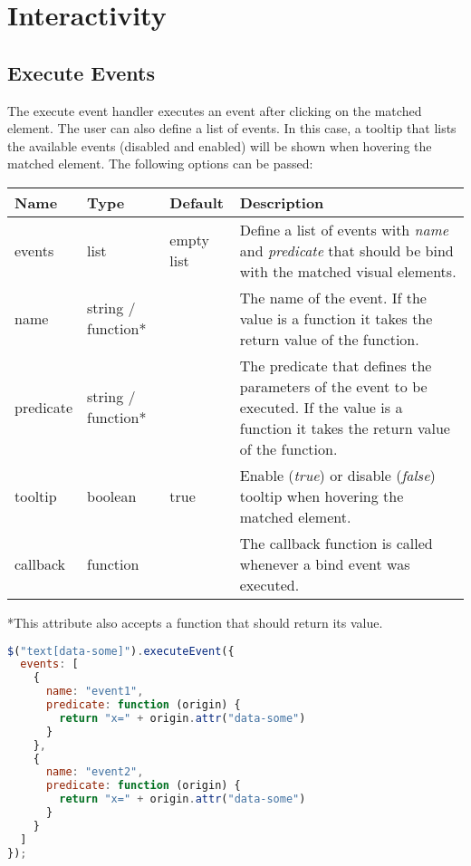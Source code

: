 \pagebreak

\section{Interactivity}
\label{sec:interactivity}

\subsection{Execute Events}
\label{sec:execute_events}

The execute event handler executes an event after clicking on the matched element.
The user can also define a list of events.
In this case, a tooltip that lists the available events (disabled and enabled) will be shown when hovering the matched element.
The following options can be passed:

\vspace{0.5cm}
\begin{tabular}{ l l l p{7cm} }
  \textbf{Name} & \textbf{Type} & \textbf{Default} & \textbf{Description} \\
  \hline\noalign{\medskip}
  events & list & empty list & Define a list of events with \textit{name} and \textit{predicate} that should be bind with the matched visual elements. \\
  \hline\noalign{\medskip}
  \hspace{0.5cm} name & string / function* & & The name of the event. If the value is a function it takes the return value of the function.\\
  \hline\noalign{\medskip}
  \hspace{0.5cm}  predicate & string / function* & & The predicate that defines the parameters of the event to be executed. If the value is a function it takes the return value of the function.\\
  \hline\noalign{\medskip}
  tooltip & boolean & true & Enable (\textit{true}) or disable (\textit{false}) tooltip when hovering the matched element.\\
  \hline\noalign{\medskip}
  callback & function &  & The callback function is called whenever a bind event was executed.
\end{tabular}

*This attribute also accepts a function that should return its value.

\begin{lstlisting}[float=ht!,language=JavaScript]
$("text[data-some]").executeEvent({
  events: [
    { 
      name: "event1", 
      predicate: function (origin) {
        return "x=" + origin.attr("data-some") 
      }
    },
    {
      name: "event2", 
      predicate: function (origin) {
        return "x=" + origin.attr("data-some")
      }
    } 
  ]
});
\end{lstlisting}
